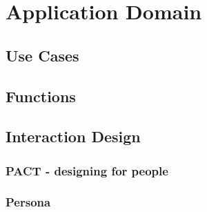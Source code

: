 \chapter{Application Domain}

\section{Use Cases}\label{usecase}


\section{Functions}


\section{Interaction Design}
\subsection{PACT - designing for people}\label{pact}


\subsection{Persona}
